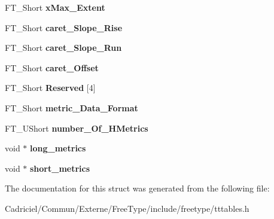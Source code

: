 \begin{DoxyCompactItemize}
\item 
\hypertarget{struct_t_t___hori_header___ab483cb323f9adc9d959209a42eb19957}{F\-T\-\_\-\-Short {\bfseries x\-Max\-\_\-\-Extent}}\label{struct_t_t___hori_header___ab483cb323f9adc9d959209a42eb19957}

\item 
\hypertarget{struct_t_t___hori_header___aeb43d92f56de424d8f28bd389973eca4}{F\-T\-\_\-\-Short {\bfseries caret\-\_\-\-Slope\-\_\-\-Rise}}\label{struct_t_t___hori_header___aeb43d92f56de424d8f28bd389973eca4}

\item 
\hypertarget{struct_t_t___hori_header___acce162ae0554006c11a3383bd3454d69}{F\-T\-\_\-\-Short {\bfseries caret\-\_\-\-Slope\-\_\-\-Run}}\label{struct_t_t___hori_header___acce162ae0554006c11a3383bd3454d69}

\item 
\hypertarget{struct_t_t___hori_header___a791ad767d54cc87e84d9b03d6739f0eb}{F\-T\-\_\-\-Short {\bfseries caret\-\_\-\-Offset}}\label{struct_t_t___hori_header___a791ad767d54cc87e84d9b03d6739f0eb}

\item 
\hypertarget{struct_t_t___hori_header___af2a2b374d8f81771fb75d3bdc96bcbf7}{F\-T\-\_\-\-Short {\bfseries Reserved} \mbox{[}4\mbox{]}}\label{struct_t_t___hori_header___af2a2b374d8f81771fb75d3bdc96bcbf7}

\item 
\hypertarget{struct_t_t___hori_header___a0ed857e9629d2dfb5350a6b5976bf933}{F\-T\-\_\-\-Short {\bfseries metric\-\_\-\-Data\-\_\-\-Format}}\label{struct_t_t___hori_header___a0ed857e9629d2dfb5350a6b5976bf933}

\item 
\hypertarget{struct_t_t___hori_header___aac3ecb9ba7c13436a663b91765e89647}{F\-T\-\_\-\-U\-Short {\bfseries number\-\_\-\-Of\-\_\-\-H\-Metrics}}\label{struct_t_t___hori_header___aac3ecb9ba7c13436a663b91765e89647}

\item 
\hypertarget{struct_t_t___hori_header___a3eeb5766b461e9563b659a30e775fcc2}{void $\ast$ {\bfseries long\-\_\-metrics}}\label{struct_t_t___hori_header___a3eeb5766b461e9563b659a30e775fcc2}

\item 
\hypertarget{struct_t_t___hori_header___ae39107c4cfc3e7c1871dbb304bbe4a5a}{void $\ast$ {\bfseries short\-\_\-metrics}}\label{struct_t_t___hori_header___ae39107c4cfc3e7c1871dbb304bbe4a5a}

\end{DoxyCompactItemize}


The documentation for this struct was generated from the following file\-:\begin{DoxyCompactItemize}
\item 
Cadriciel/\-Commun/\-Externe/\-Free\-Type/include/freetype/tttables.\-h\end{DoxyCompactItemize}
